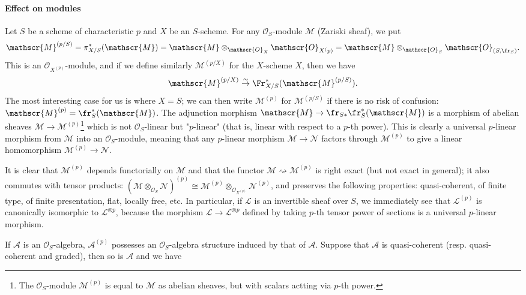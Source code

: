 \paragraph{Effect on modules}
Let $S$ be a scheme of characteristic $p$ and $X$ be an $S$-scheme. For any $\mathscr{O}_S$-module $\mathscr{M}$ (Zariski sheaf), we put
\[\mathscr{M}^{(p/S)}=\pi_{X/S}^*(\mathscr{M})=\mathscr{M}\otimes_{\mathscr{O}_X}\mathscr{O}_{X^(p)}=\mathscr{M}\otimes_{\mathscr{O}_S}\mathscr{O}_{(S,\fr_S)}.\]
This is an $\mathscr{O}_{X^{(p)}}$-module, and if we define similarly $\mathscr{M}^{(p/X)}$ for the $X$-scheme $X$, then we have
\[\mathscr{M}^{(p/X)}\stackrel{\sim}{\to}\Fr_{X/S}^*(\mathscr{M}^{(p/S)}).\]
The most interesting case for us is where $X=S$; we can then write $\mathscr{M}^{(p)}$ for $\mathscr{M}^{(p/S)}$ if there is no risk of confusion: $\mathscr{M}^{(p)}=\fr_S^*(\mathscr{M})$. The adjunction morphism $\mathscr{M}\to\fr_{S*}\fr_S^*(\mathscr{M})$ is a morphism of abelian sheaves $\mathscr{M}\to\mathscr{M}^{(p)}$\footnote{The $\mathscr{O}_S$-module $\mathscr{M}^{(p)}$ is equal to $\mathscr{M}$ as abelian sheaves, but with scalars actting via $p$-th power.} which is not $\mathscr{O}_S$-linear but "$p$-linear" (that is, linear with respect to a $p$-th power). This is clearly a universal $p$-linear morphism from $\mathscr{M}$ into an $\mathscr{O}_S$-module, meaning that any $p$-linear morphism $\mathscr{M}\to\mathscr{N}$ factors through $\mathscr{M}^{(p)}$ to give a linear homomorphism $\mathscr{M}^{(p)}\to\mathscr{N}$.\par
It is clear that $\mathscr{M}^{(p)}$ depends functorially on $\mathscr{M}$ and that the functor $\mathscr{M}\rightsquigarrow\mathscr{M}^{(p)}$ is right exact (but not exact in general); it also commutes with tensor products: $(\mathscr{M}\otimes_{\mathscr{O}_S}\mathscr{N})^{(p)}\cong\mathscr{M}^{(p)}\otimes_{\mathscr{O}_{X^{(p)}}}\mathscr{N}^{(p)}$, and preserves the following properties: quasi-coherent, of finite type, of finite presentation, flat, locally free, etc. In particular, if $\mathscr{L}$ is an invertible sheaf over $S$, we immediately see that $\mathscr{L}^{(p)}$ is canonically isomorphic to $\mathscr{L}^{\otimes p}$, because the morphism $\mathscr{L}\to\mathscr{L}^{\otimes p}$ defined by taking $p$-th tensor power of sections is a universal $p$-linear morphism.\par
If $\mathscr{A}$ is an $\mathscr{O}_S$-algebra, $\mathscr{A}^{(p)}$ possesses an $\mathscr{O}_S$-algebra structure induced by that of $\mathscr{A}$. Suppose that $\mathscr{A}$ is quasi-coherent (resp. quasi-coherent and graded), then so is $\mathscr{A}$ and we have

